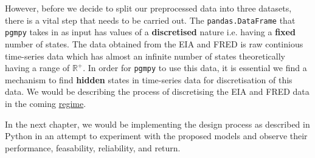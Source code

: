 However, before we decide to split our preprocessed data into three datasets, there is a vital step that needs to be carried out. The \texttt{pandas.DataFrame} that \texttt{pgmpy} takes in as input has values of a \textbf{discretised} nature i.e. having a \textbf{fixed} number of states. The data obtained from the EIA and FRED is raw continious time-series data which has almost an infinite number of states theoretically having a range of $\mathbb{R}^+$. In order for \texttt{pgmpy} to use this data, it is essential we find a mechanism to find \textbf{hidden} states in time-series data for discretisation of this data. We would be describing the process of discretising the EIA and FRED data in the coming \hyperref[regime]{regime}.

In the next chapter, we would be implementing the design process as described in Python in an attempt to experiment with the proposed models and observe their performance, feasability, reliability, and return. 






